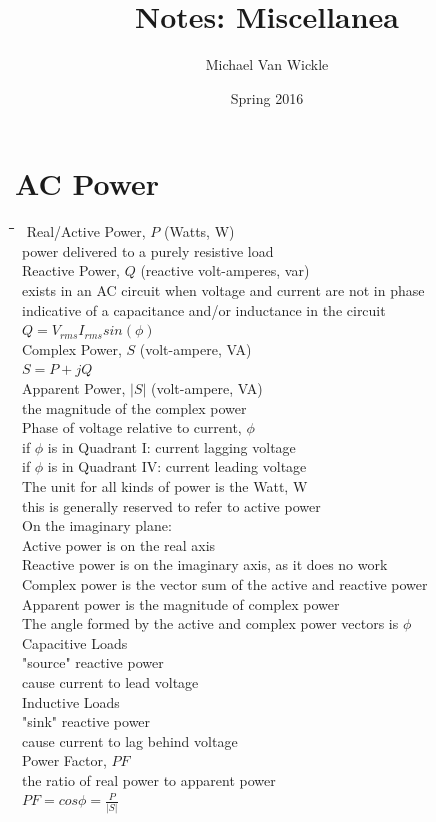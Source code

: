 \documentclass[10pt,letterpaper]{scrartcl}
\title{Notes: Miscellanea}
\author{Michael Van Wickle}
\date{Spring 2016}
\newcommand{\tbul}{\textbullet}
\newcommand{\tend}{\>\textendash}
\newcommand{\tabDef}{\hspace{2em}\=\hspace{2em}\=\hspace{2em}\=\hspace{2em}\=\kill}
\begin{document}
\maketitle\newpage\tableofcontents\newpage 

\section{AC Power}
\begin{tabbing}\tabDef 
\tbul\ Real/Active Power, $P$ (Watts, W) \\
	\tend\ power delivered to a purely resistive load\\
\tbul\ Reactive Power, $Q$ (reactive volt-amperes, var) \\
	\tend\ exists in an AC circuit when voltage and current are not in phase \\
    \tend\ indicative of a capacitance and/or inductance in the circuit \\
    \tend\ $\displaystyle Q = V_{rms}I_{rms}sin(\phi)$\\
\tbul\ Complex Power, $S$ (volt-ampere, VA) \\
	\tend\ $\displaystyle S = P + jQ$\\
\tbul\ Apparent Power, $|S|$ (volt-ampere, VA)\\
	\tend\ the magnitude of the complex power\\
\tbul\ Phase of voltage relative to current, $\phi$\\
	\tend\ if $\phi$ is in Quadrant I: current lagging voltage\\
    \tend\ if $\phi$ is in Quadrant IV: current leading voltage\\
\tbul\ The unit for all kinds of power is the Watt, W\\
	\tend\ this is generally reserved to refer to active power \\
\tbul\ On the imaginary plane: \\
	\tend\ Active power is on the real axis\\
    \tend\ Reactive power is on the imaginary axis, as it does no work \\
    \tend\ Complex power is the vector sum of the active and reactive power\\
    \tend\ Apparent power is the magnitude of complex power\\
    \tend\ The angle formed by the active and complex power vectors is $\phi$ \\
\tbul\ Capacitive Loads\\
	\tend\ "source" reactive power \\
    \tend\ cause current to lead voltage\\
\tbul\ Inductive Loads \\
	\tend\ "sink" reactive power\\
    \tend\ cause current to lag behind voltage \\
\tbul\ Power Factor, $PF$\\
	\tend\ the ratio of real power to apparent power \\
    \tend\ $\displaystyle PF = cos\phi = \frac{P}{|S|}$
\end{tabbing}
\end{document}
